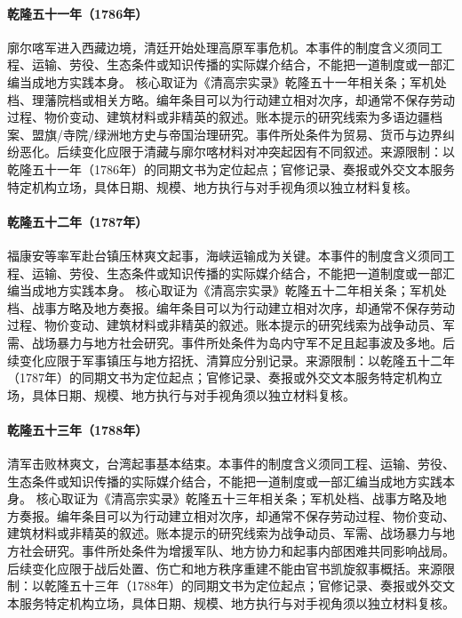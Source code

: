 \hypertarget{civic:EQ-1786-FIRST-GURKHA-WAR}{}\paragraph{乾隆五十一年（1786年）}廓尔喀军进入西藏边境，清廷开始处理高原军事危机。本事件的制度含义须同工程、运输、劳役、生态条件或知识传播的实际媒介结合，不能把一道制度或一部汇编当成地方实践本身。 核心取证为《清高宗实录》乾隆五十一年相关条；军机处档、理藩院档或相关方略。编年条目可以为行动建立相对次序，却通常不保存劳动过程、物价变动、建筑材料或非精英的叙述。账本提示的研究线索为多语边疆档案、盟旗/寺院/绿洲地方史与帝国治理研究。事件所处条件为贸易、货币与边界纠纷恶化。后续变化应限于清藏与廓尔喀材料对冲突起因有不同叙述。来源限制：以乾隆五十一年（1786年）的同期文书为定位起点；官修记录、奏报或外交文本服务特定机构立场，具体日期、规模、地方执行与对手视角须以独立材料复核。
\hypertarget{civic:EQ-1787-TAIWAN-CAMPAIGN}{}\paragraph{乾隆五十二年（1787年）}福康安等率军赴台镇压林爽文起事，海峡运输成为关键。本事件的制度含义须同工程、运输、劳役、生态条件或知识传播的实际媒介结合，不能把一道制度或一部汇编当成地方实践本身。 核心取证为《清高宗实录》乾隆五十二年相关条；军机处档、战事方略及地方奏报。编年条目可以为行动建立相对次序，却通常不保存劳动过程、物价变动、建筑材料或非精英的叙述。账本提示的研究线索为战争动员、军需、战场暴力与地方社会研究。事件所处条件为岛内守军不足且起事波及多地。后续变化应限于军事镇压与地方招抚、清算应分别记录。来源限制：以乾隆五十二年（1787年）的同期文书为定位起点；官修记录、奏报或外交文本服务特定机构立场，具体日期、规模、地方执行与对手视角须以独立材料复核。
\hypertarget{civic:EQ-1788-LIN-SHUANGWEN-DEFEAT}{}\paragraph{乾隆五十三年（1788年）}清军击败林爽文，台湾起事基本结束。本事件的制度含义须同工程、运输、劳役、生态条件或知识传播的实际媒介结合，不能把一道制度或一部汇编当成地方实践本身。 核心取证为《清高宗实录》乾隆五十三年相关条；军机处档、战事方略及地方奏报。编年条目可以为行动建立相对次序，却通常不保存劳动过程、物价变动、建筑材料或非精英的叙述。账本提示的研究线索为战争动员、军需、战场暴力与地方社会研究。事件所处条件为增援军队、地方协力和起事内部困难共同影响战局。后续变化应限于战后处置、伤亡和地方秩序重建不能由官书凯旋叙事概括。来源限制：以乾隆五十三年（1788年）的同期文书为定位起点；官修记录、奏报或外交文本服务特定机构立场，具体日期、规模、地方执行与对手视角须以独立材料复核。
